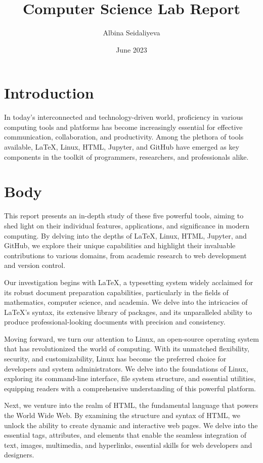 \documentclass{report}
\title{Computer Science Lab Report}
\author{Albina Seidaliyeva}
\date{June 2023}
\begin{document}
\maketitle

\tableofcontents

\chapter{Introduction}

In today's interconnected and technology-driven world, proficiency in various computing tools and platforms has become increasingly essential for effective communication, collaboration, and productivity. Among the plethora of tools available, LaTeX, Linux, HTML, Jupyter, and GitHub have emerged as key components in the toolkit of programmers, researchers, and professionals alike.

\chapter{Body}

This report presents an in-depth study of these five powerful tools, aiming to shed light on their individual features, applications, and significance in modern computing. By delving into the depths of LaTeX, Linux, HTML, Jupyter, and GitHub, we explore their unique capabilities and highlight their invaluable contributions to various domains, from academic research to web development and version control.

Our investigation begins with LaTeX, a typesetting system widely acclaimed for its robust document preparation capabilities, particularly in the fields of mathematics, computer science, and academia. We delve into the intricacies of LaTeX's syntax, its extensive library of packages, and its unparalleled ability to produce professional-looking documents with precision and consistency.

Moving forward, we turn our attention to Linux, an open-source operating system that has revolutionized the world of computing. With its unmatched flexibility, security, and customizability, Linux has become the preferred choice for developers and system administrators. We delve into the foundations of Linux, exploring its command-line interface, file system structure, and essential utilities, equipping readers with a comprehensive understanding of this powerful platform.

Next, we venture into the realm of HTML, the fundamental language that powers the World Wide Web. By examining the structure and syntax of HTML, we unlock the ability to create dynamic and interactive web pages. We delve into the essential tags, attributes, and elements that enable the seamless integration of text, images, multimedia, and hyperlinks, essential skills for web developers and designers.
\end{document}

